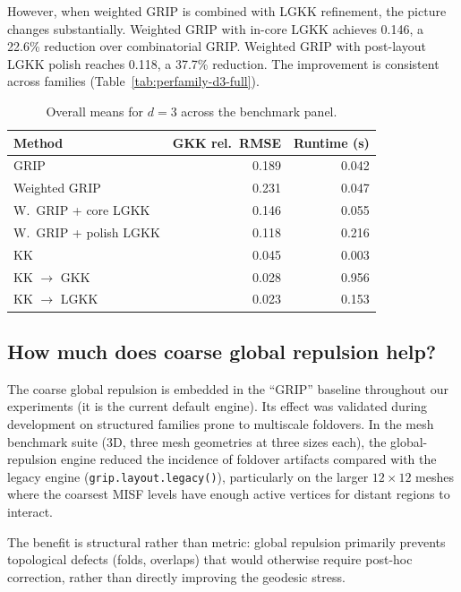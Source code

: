 \documentclass[11pt,twocolumn]{article}
\begin{document}
However, when weighted GRIP is combined with LGKK refinement, the
picture changes substantially.  Weighted GRIP with in-core LGKK achieves
0.146, a 22.6\% reduction over combinatorial GRIP.  Weighted GRIP with
post-layout LGKK polish reaches 0.118, a 37.7\% reduction.  The
improvement is consistent across families
(Table~\ref{tab:perfamily-d3-full}).

\begin{table}[t]
\centering
\caption{Overall means for $d = 3$ across the benchmark panel.}
\label{tab:overall-d3}
\small
\begin{tabular}{lrr}
\toprule
Method & GKK rel.\ RMSE & Runtime (s) \\
\midrule
GRIP                       & 0.189 & 0.042 \\
Weighted GRIP              & 0.231 & 0.047 \\
W.\ GRIP + core LGKK      & 0.146 & 0.055 \\
W.\ GRIP + polish LGKK    & 0.118 & 0.216 \\
KK                         & 0.045 & 0.003 \\
KK $\to$ GKK              & 0.028 & 0.956 \\
KK $\to$ LGKK             & 0.023 & 0.153 \\
\bottomrule
\end{tabular}
\end{table}

\subsection{How much does coarse global repulsion help?}

The coarse global repulsion is embedded in the ``GRIP'' baseline
throughout our experiments (it is the current default engine).  Its
effect was validated during development on structured families prone to
multiscale foldovers.  In the mesh benchmark suite (3D, three mesh
geometries at three sizes each), the global-repulsion engine reduced the
incidence of foldover artifacts compared with the legacy engine
(\texttt{grip.layout.legacy()}), particularly on the larger $12 \times
12$ meshes where the coarsest MISF levels have enough active vertices for
distant regions to interact.

The benefit is structural rather than metric: global repulsion primarily
prevents topological defects (folds, overlaps) that would otherwise
require post-hoc correction, rather than directly improving the geodesic
stress.
\end{document}
